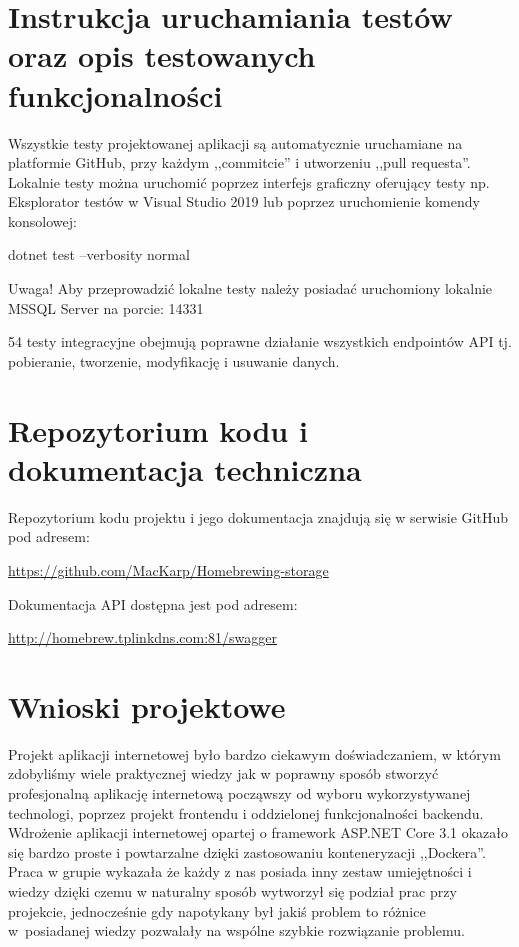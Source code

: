 \documentclass[12pt,a4paper]{article}
\begin{document}
	\newpage
	
	\section{Instrukcja uruchamiania testów oraz opis testowanych funkcjonalności}
		\indent Wszystkie testy projektowanej aplikacji są automatycznie uruchamiane na platformie GitHub, przy każdym ,,commitcie'' i utworzeniu ,,pull requesta''.
			Lokalnie testy można uruchomić poprzez interfejs graficzny oferujący testy np. Eksplorator testów w Visual Studio 2019 lub poprzez uruchomienie komendy konsolowej:
				\begin{tcolorbox}[minipage,colback=white,arc=0pt,outer arc=0pt, fontupper=\scriptsize]
					dotnet test --verbosity normal
				\end{tcolorbox}
				\begin{tcolorbox}[minipage,colback=white,arc=0pt,outer arc=0pt, fontupper=\scriptsize]
					Uwaga! Aby przeprowadzić lokalne testy należy posiadać uruchomiony lokalnie MSSQL Server na porcie: 14331
				\end{tcolorbox}
				 54 testy integracyjne obejmują poprawne działanie wszystkich endpointów API tj. pobieranie, tworzenie, modyfikację i usuwanie danych.     
	\newpage
	
	\section{Repozytorium kodu i dokumentacja techniczna}
		\indent Repozytorium kodu projektu i jego dokumentacja znajdują się w serwisie GitHub pod adresem: 
			\begin{tcolorbox}[minipage,colback=white,arc=0pt,outer arc=0pt, fontupper=\scriptsize]
				\center									
				\url{https://github.com/MacKarp/Homebrewing-storage}
			\end{tcolorbox}
		\indent Dokumentacja API dostępna jest pod adresem:
				\begin{tcolorbox}[minipage,colback=white,arc=0pt,outer arc=0pt, fontupper=\scriptsize]
					\center					
					\url{http://homebrew.tplinkdns.com:81/swagger}
				\end{tcolorbox}
	\newpage
	
	\section{Wnioski projektowe}
		\indent Projekt aplikacji internetowej było bardzo ciekawym doświadczaniem, w którym zdobyliśmy wiele praktycznej wiedzy jak w poprawny sposób
			stworzyć profesjonalną aplikację internetową począwszy od wyboru wykorzystywanej technologi, poprzez projekt frontendu i oddzielonej funkcjonalności backendu.
			Wdrożenie aplikacji internetowej opartej o framework ASP.NET Core 3.1 okazało się bardzo proste i powtarzalne dzięki zastosowaniu konteneryzacji ,,Dockera''.
			Praca w grupie wykazała że każdy z nas posiada inny zestaw umiejętności i wiedzy dzięki czemu w naturalny sposób wytworzył się podział prac przy projekcie,
			jednocześnie gdy napotykany był jakiś problem to różnice w~posiadanej wiedzy pozwalały na wspólne szybkie rozwiązanie problemu. 
\end{document}
